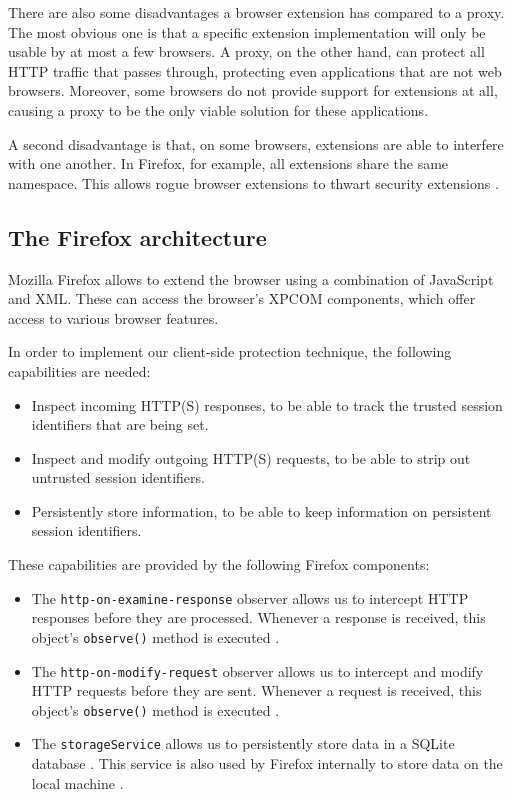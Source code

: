 There are also some disadvantages a browser extension has compared to a proxy. The most obvious one is that a specific extension implementation will only be usable by at most a few browsers. A proxy, on the other hand, can protect all HTTP traffic that passes through, protecting even applications that are not web browsers. Moreover, some browsers do not provide support for extensions at all, causing a proxy to be the only viable solution for these applications.

A second disadvantage is that, on some browsers, extensions are able to interfere with one another. In Firefox, for example, all extensions share the same namespace. This allows rogue browser extensions to thwart security extensions \cite{Barth2010,TerLouw2007}.

\subsection{The Firefox architecture}

Mozilla Firefox allows to extend the browser using a combination of JavaScript and XML. These can access the browser's XPCOM components, which offer access to various browser features.

In order to implement our client-side protection technique, the following capabilities are needed:
\begin{itemize}
	\item Inspect incoming HTTP(S) responses, to be able to track the trusted session identifiers that are being set.
	\item Inspect and modify outgoing HTTP(S) requests, to be able to strip out untrusted session identifiers.
	\item Persistently store information, to be able to keep information on persistent session identifiers.
\end{itemize}
These capabilities are provided by the following Firefox components:
\begin{itemize}
	\item The \texttt{http-on-examine-response} observer allows us to intercept HTTP responses before they are processed. Whenever a response is received, this object's \texttt{observe()} method is executed \cite{MozillaObservers}.
	\item The \texttt{http-on-modify-request} observer allows us to intercept and modify HTTP requests before they are sent. Whenever a request is received, this object's \texttt{observe()} method is executed \cite{MozillaObservers}.
	\item The \texttt{storageService} allows us to persistently store data in a SQLite database \cite{MozillaStorage}. This service is also used by Firefox internally to store data on the local machine \cite{Bonne2011,MozillaStorage}.
\end{itemize}

